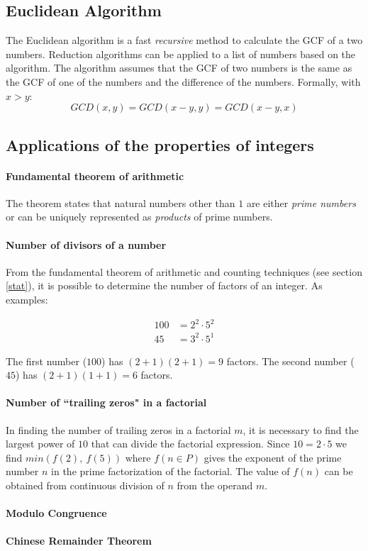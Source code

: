 \subsection{Euclidean Algorithm}
The Euclidean algorithm is a fast \emph{recursive} method to calculate the GCF of a two numbers.
Reduction algorithms can be applied to a list of numbers based on the algorithm.
The algorithm assumes that the GCF of two numbers is the same as the GCF of one of the numbers and the difference of the numbers.
Formally, with $x > y$:
\[
GCD(x, y) = GCD(x-y, y) = GCD(x-y, x)
\]

\subsection{Applications of the properties of integers}
\paragraph{Fundamental theorem of arithmetic}
The theorem states that natural numbers other than $1$ are either \emph{prime numbers} or can be uniquely represented as \emph{products} of prime numbers.

\paragraph{Number of divisors of a number}
From the fundamental theorem of arithmetic and counting techniques (see section \ref{stat}), it is possible to determine the number of factors of an integer.
As examples:

\begin{align*}
100 &= 2^2 \cdot 5^2 \\
45 &= 3^2 \cdot 5^1
\end{align*}

The first number ($100$) has $(2+1)(2+1) = 9$ factors.
The second number ($45$) has $(2+1)(1+1) = 6$ factors.

\paragraph{Number of ``trailing zeros" in a factorial}
In finding the number of trailing zeros in a factorial $m$, it is necessary to find the largest power of $10$ that can divide the factorial expression.
Since $10 = 2\cdot 5$ we find $min(f(2),\ f(5))$ where $f(n\in P)$ gives the exponent of the prime number $n$ in the prime factorization of the factorial.
The value of $f(n)$ can be obtained from continuous division of $n$ from the operand $m$.

\paragraph{Modulo Congruence}

\paragraph{Chinese Remainder Theorem}
